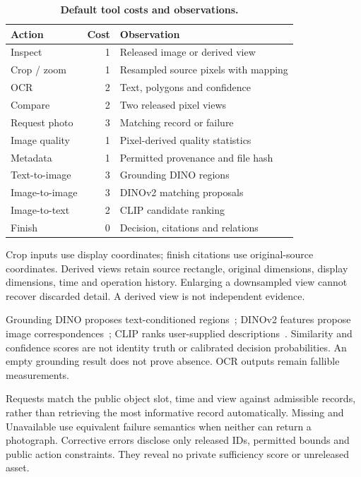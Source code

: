 \begin{table}[t]
\centering\small
\caption{\textbf{Default tool costs and observations.}}
\label{tab:supptools}
\begin{tabularx}{\linewidth}{@{}l r Y@{}}
\toprule
Action & Cost & Observation\\
\midrule
Inspect & 1 & Released image or derived view\\
Crop / zoom & 1 & Resampled source pixels with mapping\\
OCR & 2 & Text, polygons and confidence\\
Compare & 2 & Two released pixel views\\
Request photo & 3 & Matching record or failure\\
Image quality & 1 & Pixel-derived quality statistics\\
Metadata & 1 & Permitted provenance and file hash\\
Text-to-image & 3 & Grounding DINO regions\\
Image-to-image & 3 & DINOv2 matching proposals\\
Image-to-text & 2 & CLIP candidate ranking\\
Finish & 0 & Decision, citations and relations\\
\bottomrule
\end{tabularx}
\end{table}

Crop inputs use display coordinates; finish citations use original-source coordinates.
Derived views retain source rectangle, original dimensions, display dimensions, time and operation history.
Enlarging a downsampled view cannot recover discarded detail.
A derived view is not independent evidence.

Grounding DINO proposes text-conditioned regions~\cite{groundingdino}; DINOv2 features propose image correspondences~\cite{dinov2}; CLIP ranks user-supplied descriptions~\cite{clip}.
Similarity and confidence scores are not identity truth or calibrated decision probabilities.
An empty grounding result does not prove absence.
OCR outputs remain fallible measurements.

Requests match the public object slot, time and view against admissible records, rather than retrieving the most informative record automatically.
Missing and Unavailable use equivalent failure semantics when neither can return a photograph.
Corrective errors disclose only released IDs, permitted bounds and public action constraints.
They reveal no private sufficiency score or unreleased asset.

